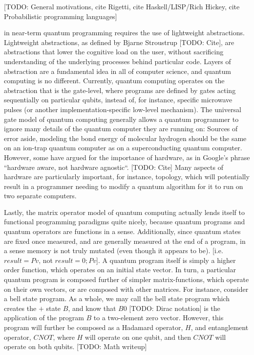 \documentclass[journal]{IEEEtran}
\begin{document}
[TODO: General motivations, cite Rigetti, cite Haskell/LISP/Rich Hickey, cite Probabilistic programming languages]

 in near-term quantum programming requires the use of lightweight abstractions. 
Lightweight abstractions, as defined by Bjarne Stroustrup [TODO: Cite], are abstractions that lower the cognitive load on the user, without sacrificing understanding of the underlying processes behind particular code.
Layers of abstraction are a fundamental idea in all of computer science, and quantum computing is no different.
Currently, quantum computing operates on the abstraction that is the gate-level, where programs are defined by gates acting sequentially on particular qubits, instead of, for instance, specific microwave pulses (or another implementation-specific low-level mechanism).
The universal gate model of quantum computing generally allows a quantum programmer to ignore many details of the quantum computer they are running on: Sources of error aside, modeling the bond energy of molecular hydrogen should be the same on an ion-trap quantum computer as on a superconducting quantum computer.
However, some have argued for the importance of hardware, as in Google's phrase ``hardware aware, not hardware agnostic``. [TODO: Cite]
Many aspects of hardware are particularly important, for instance, topology, which will potentially result in a programmer needing to modify a quantum algorithm for it to run on two separate computers.

Lastly, the matrix operator model of quantum computing actually lends itself to functional programming paradigms quite nicely, because quantum programs and quantum operators are functions in a sense.
Additionally, since quantum states are fixed once measured, and are generally measured at the end of a program, in a sense memory is not truly mutated (even though it appears to be). 
[i.e. $result = Pv$, not $result = 0; Pv$].
A quantum program itself is simply a higher order function, which operates on an initial state vector.
In turn, a particular quantum program is composed further of simpler matrix-functions, which operate on their own vectors, or are composed with other matrices.
For instance, consider a bell state program. 
As a whole, we may call the bell state program which creates the $+$ state $B$, and know that $B 0$ [TODO: Dirac notation] is the application of the program $B$ to a two-element zero vector.
However, this program will further be composed as a Hadamard operator, $H$, and entanglement operator, $CNOT$, where $H$ will operate on one qubit, and then $CNOT$ will operate on both qubits. [TODO: Math writeup]
\end{document}
